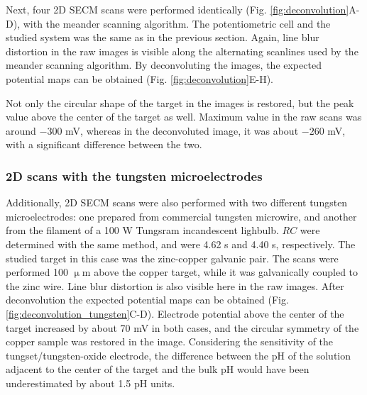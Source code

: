 Next, four 2D SECM scans were performed identically (Fig. \ref{fig:deconvolution}A-D), with the meander scanning algorithm.
The potentiometric cell and the studied system was the same as in the previous section.
Again, line blur distortion in the raw images is visible along the alternating scanlines used by the meander scanning algorithm.
By deconvoluting the images, the expected potential maps can be obtained (Fig. \ref{fig:deconvolution}E-H). 

Not only the circular shape of the target in the images is restored, but the peak value above the center of the target as well.
Maximum value in the raw scans was around $-300$ mV, whereas in the deconvoluted image, it was about $-260$ mV, with a significant difference between the two. 

			\subsubsection{2D scans with the tungsten microelectrodes}
Additionally, 2D SECM scans were also performed with two different tungsten microelectrodes: one prepared from commercial tungsten microwire, and another from the filament of a 100 W Tungsram incandescent lighbulb.
$RC$ were determined with the same method, and were 4.62 s and 4.40 s, respectively.
The studied target in this case was the zinc-copper galvanic pair.
The scans were performed 100 $\upmu$m above the copper target, while it was galvanically coupled to the zinc wire.
Line blur distortion is also visible here in the raw images.
After deconvolution the expected potential maps can be obtained (Fig. \ref{fig:deconvolution_tungsten}C-D).
Electrode potential above the center of the target increased by about 70 mV in both cases, and the circular symmetry of the copper sample was restored in the image.
Considering the sensitivity of the tungset/tungsten-oxide electrode, the difference between the pH of the solution adjacent to the center of the target and the bulk pH would have been underestimated by about 1.5 pH units.


